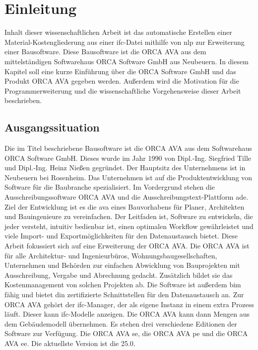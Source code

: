\chapter{Einleitung}
\label{c:intro}

Inhalt dieser wissenschaftlichen Arbeit ist das automatische Erstellen einer Material-Kostengliederung aus einer \ac{ifc}-Datei mithilfe von \ac{nlp} zur Erweiterung einer Bausoftware. Diese Bausoftware ist die ORCA AVA aus dem mittelständigen Softwarehaus \glqq ORCA Software GmbH\grqq{} aus Neubeuern. 
In diesem Kapitel soll eine kurze Einführung über die \glqq ORCA Software GmbH\grqq{} und das Produkt  ORCA AVA gegeben werden. Außerdem wird die Motivation für die Programmerweiterung und die wissenschaftliche Vorgehensweise dieser Arbeit beschrieben.

\section{Ausgangssituation}
\label{c:intro:start}

Die im Titel beschriebene Bausoftware ist die ORCA AVA aus dem Softwarehaus \glqq ORCA Software GmbH\grqq{}. Dieses wurde im Jahr 1990 von Dipl.-Ing. Siegfried Tille und Dipl.-Ing. Heinz Nießen gegründet. Der Hauptsitz des Unternehmens ist in Neubeuern bei Rosenheim. Das Unternehmen ist auf die Produktentwicklung von Software für die Baubranche spezialisiert. Im Vordergrund stehen die Ausschreibungssoftware ORCA AVA und die Ausschreibungstext-Plattform \ac{ade}. Ziel der Entwicklung ist es die \ac{ava} eines Bauvorhabens für Planer, Architekten und Bauingenieure zu vereinfachen. Der Leitfaden ist, Software zu entwickeln, die jeder versteht, intuitiv bedienbar ist, einen optimalen Workflow gewährleistet und viele Import- und Exportmöglichkeiten für den Datenaustausch bietet.
Diese Arbeit fokussiert sich auf eine Erweiterung der ORCA AVA. Die ORCA AVA ist für alle Architektur- und Ingenieurbüros, Wohnungsbaugesellschaften, Unternehmen und Behörden zur einfachen Abwicklung von Bauprojekten mit Ausschreibung, Vergabe und Abrechnung gedacht. Zusätzlich bildet sie das Kostenmanagement von solchen Projekten ab. Die Software ist außerdem \ac{bim} fähig und bietet \ac{din} zertifizierte Schnittstellen für den Datenaustausch an. Zur ORCA AVA gehört der \ac{ifc}-Manager, der als eigene Instanz in einem extra Prozess läuft. Dieser kann \ac{ifc}-Modelle anzeigen. Die ORCA AVA kann dann Mengen aus dem Gebäudemodell übernehmen.
Es stehen drei verschiedene Editionen der Software zur Verfügung. Die ORCA AVA \ac{se}, die ORCA AVA \ac{pe} und die ORCA AVA \ac{ee}. Die aktuellste Version ist die 25.0.

